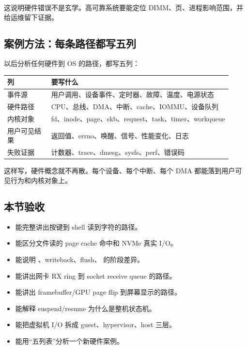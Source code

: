 这说明硬件错误不是玄学。高可靠系统要能定位 DIMM、页、进程影响范围，并给运维留下证据。

\subsection{案例方法：每条路径都写五列}

以后分析任何硬件到 OS 的路径，都写五列：

\begin{longtable}{p{0.18\linewidth}p{0.74\linewidth}}
\toprule
列 & 要写什么 \\
\midrule
事件源 & 用户调用、设备事件、定时器、故障、温度、电源状态 \\
硬件路径 & CPU、总线、DMA、中断、cache、IOMMU、设备队列 \\
内核对象 & fd、inode、page、skb、request、task、timer、workqueue \\
用户可见结果 & 返回值、errno、唤醒、信号、性能变化、日志 \\
失败证据 & 计数器、trace、dmesg、sysfs、perf、错误码 \\
\bottomrule
\end{longtable}

这样写，硬件概念就不再散。每个设备、每个中断、每个 DMA 都能落到用户可见行为和内核对象上。

\subsection{本节验收}

\begin{rubricbox}
\begin{itemize}
\tightlist
\item 能完整讲出按键到 shell 读到字符的路径。
\item 能区分文件读的 page cache 命中和 NVMe 真实 I/O。
\item 能说明 、writeback、flush、 的阶段差异。
\item 能讲出网卡 RX ring 到 socket receive queue 的路径。
\item 能讲出 framebuffer/GPU page flip 到屏幕显示的路径。
\item 能解释 suspend/resume 为什么是整机状态机。
\item 能把虚拟机 I/O 拆成 guest、hypervisor、host 三层。
\item 能用“五列表”分析一个新硬件案例。
\end{itemize}
\end{rubricbox}
